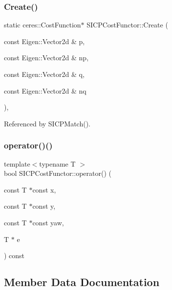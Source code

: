 \subsubsection{\texorpdfstring{Create()}{Create()}}
{\footnotesize\ttfamily static ceres\+::\+Cost\+Function$\ast$ S\+I\+C\+P\+Cost\+Functor\+::\+Create (\begin{DoxyParamCaption}\item[{const Eigen\+::\+Vector2d \&}]{p,  }\item[{const Eigen\+::\+Vector2d \&}]{np,  }\item[{const Eigen\+::\+Vector2d \&}]{q,  }\item[{const Eigen\+::\+Vector2d \&}]{nq }\end{DoxyParamCaption})\hspace{0.3cm}{\ttfamily [inline]}, {\ttfamily [static]}}



Referenced by S\+I\+C\+P\+Match().

\mbox{\label{structSICPCostFunctor_a6153374b01d7e00d6c387006d202993e}} 
\subsubsection{\texorpdfstring{operator()()}{operator()()}}
{\footnotesize\ttfamily template$<$typename T $>$ \\
bool S\+I\+C\+P\+Cost\+Functor\+::operator() (\begin{DoxyParamCaption}\item[{const T $\ast$const}]{x,  }\item[{const T $\ast$const}]{y,  }\item[{const T $\ast$const}]{yaw,  }\item[{T $\ast$}]{e }\end{DoxyParamCaption}) const\hspace{0.3cm}{\ttfamily [inline]}}



\subsection{Member Data Documentation}
\mbox{\label{structSICPCostFunctor_ab54300b932172659d1490eaef9d9bd24}} 
